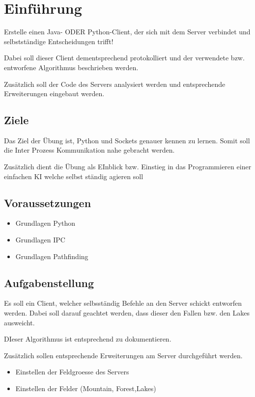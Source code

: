 
\section{Einführung}
Erstelle einen Java- ODER Python-Client, der sich mit dem Server verbindet und selbstständige Entscheidungen trifft!

Dabei soll dieser Client dementsprechend protokolliert und der verwendete bzw. entworfene Algorithmus beschrieben werden.

Zusätzlich soll der Code des Servers analysiert werden und entsprechende Erweiterungen eingebaut werden.

\subsection{Ziele}
Das Ziel der Übung ist, Python und Sockets genauer kennen zu lernen.
Somit soll die Inter Prozess Kommunikation nahe gebracht werden.

Zusätzlich dient die Übung als EInblick bzw. Einstieg in das Programmieren einer einfachen KI welche selbst ständig agieren soll
\subsection{Voraussetzungen}
\begin{itemize}
	\item Grundlagen Python
	\item Grundlagen IPC
	\item Grundlagen Pathfinding
\end{itemize}

\subsection{Aufgabenstellung}
Es soll ein Client, welcher selbsständig Befehle an den Server schickt entworfen werden. Dabei soll darauf geachtet werden, dass dieser den Fallen bzw. den Lakes ausweicht.

DIeser Algorithmus ist entsprechend zu dokumentieren.

Zusätzlich sollen entsprechende Erweiterungen am Server durchgeführt werden.
\begin{itemize}
	\item Einstellen der Feldgroesse des Servers
	\item Einstellen der Felder (Mountain, Forest,Lakes)
\end{itemize}

